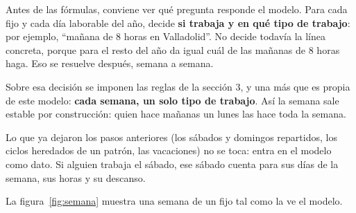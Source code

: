 \documentclass[11pt,a4paper]{article}
\begin{document}
Antes de las fórmulas, conviene ver qué pregunta responde el modelo. Para cada fijo y cada día
laborable del año, decide \textbf{si trabaja y en qué tipo de trabajo}: por ejemplo, ``mañana de
8 horas en Valladolid''. No decide todavía la línea concreta, porque para el resto del año da
igual cuál de las mañanas de 8 horas haga. Eso se resuelve después, semana a semana.

Sobre esa decisión se imponen las reglas de la sección 3, y una más que es propia de este
modelo: \textbf{cada semana, un solo tipo de trabajo}. Así la semana sale estable por
construcción: quien hace mañanas un lunes las hace toda la semana.

Lo que ya dejaron los pasos anteriores (los sábados y domingos repartidos, los ciclos heredados
de un patrón, las vacaciones) no se toca: entra en el modelo como dato. Si alguien trabaja el
sábado, ese sábado cuenta para sus días de la semana, sus horas y su descanso.

La figura~\ref{fig:semana} muestra una semana de un fijo tal como la ve el modelo.
\end{document}
